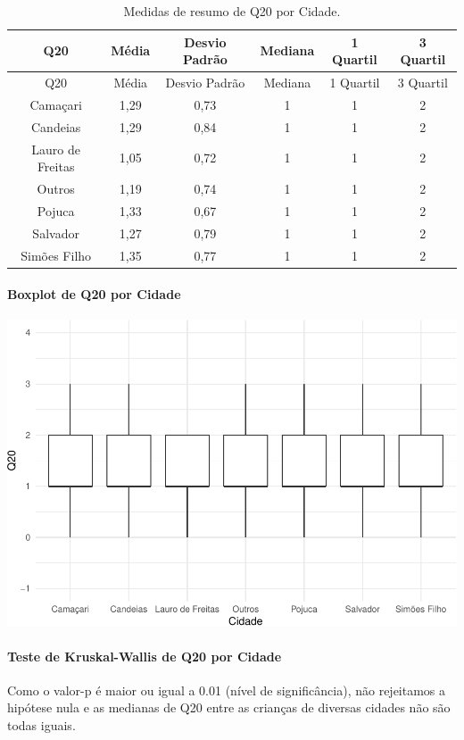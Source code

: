 \documentclass[]{article}
\let\oldparagraph\paragraph
\renewcommand{\paragraph}[1]{\oldparagraph{#1}\mbox{}}
\begin{document}
\begin{longtable}[]{@{}cccccc@{}}
\caption{\label{tab:unnamed-chunk-370}Medidas de resumo de Q20 por Cidade.}\tabularnewline
\toprule
Q20 & Média & Desvio Padrão & Mediana & 1 Quartil & 3 Quartil\tabularnewline
\midrule
\endfirsthead
\toprule
Q20 & Média & Desvio Padrão & Mediana & 1 Quartil & 3 Quartil\tabularnewline
\midrule
\endhead
Camaçari & 1,29 & 0,73 & 1 & 1 & 2\tabularnewline
Candeias & 1,29 & 0,84 & 1 & 1 & 2\tabularnewline
Lauro de Freitas & 1,05 & 0,72 & 1 & 1 & 2\tabularnewline
Outros & 1,19 & 0,74 & 1 & 1 & 2\tabularnewline
Pojuca & 1,33 & 0,67 & 1 & 1 & 2\tabularnewline
Salvador & 1,27 & 0,79 & 1 & 1 & 2\tabularnewline
Simões Filho & 1,35 & 0,77 & 1 & 1 & 2\tabularnewline
\bottomrule
\end{longtable}

\hypertarget{boxplot-de-q20-por-cidade}{%
\paragraph{Boxplot de Q20 por Cidade}\label{boxplot-de-q20-por-cidade}}

\begin{center}\includegraphics[width=0.75\linewidth]{relatorio_covid19_files/figure-latex/unnamed-chunk-371-1} \end{center}

\hypertarget{teste-de-kruskal-wallis-de-q20-por-cidade}{%
\paragraph{Teste de Kruskal-Wallis de Q20 por Cidade}\label{teste-de-kruskal-wallis-de-q20-por-cidade}}

Como o valor-p é maior ou igual a 0.01 (nível de significância), não rejeitamos a hipótese nula e as medianas de Q20 entre as crianças de diversas cidades não são todas iguais.
\end{document}
